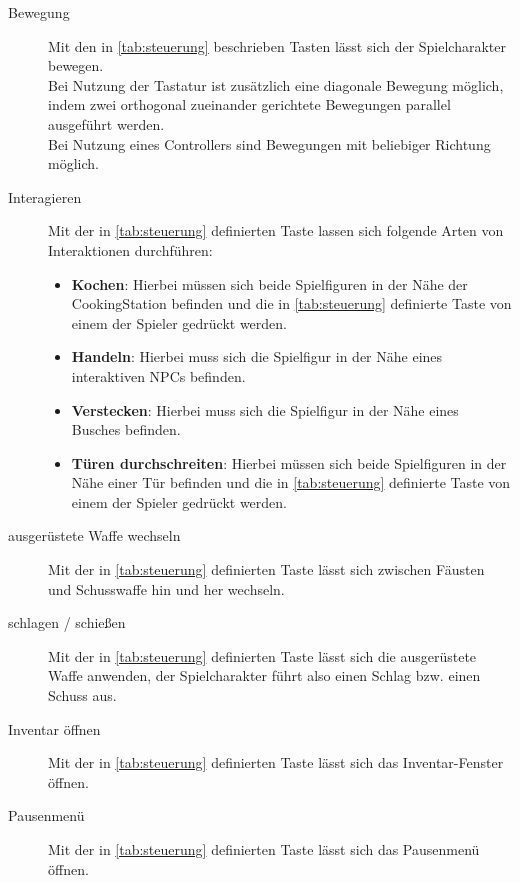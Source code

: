 \begin{description}
    \item[Bewegung]
    Mit den in \ref{tab:steuerung} beschrieben Tasten lässt sich der Spielcharakter bewegen. \\
    Bei Nutzung der Tastatur ist zusätzlich eine diagonale Bewegung möglich, indem zwei orthogonal
    zueinander gerichtete Bewegungen parallel ausgeführt werden. \\
    Bei Nutzung eines Controllers sind Bewegungen mit beliebiger Richtung möglich.
    \item[Interagieren]
    Mit der in \ref{tab:steuerung} definierten Taste lassen sich folgende Arten von
    Interaktionen durchführen:
    \begin{itemize}
        \item \textbf{Kochen}:
        Hierbei müssen sich beide Spielfiguren in der Nähe der CookingStation befinden
        und die in \ref{tab:steuerung} definierte Taste von einem der Spieler
        gedrückt werden.
        \item \textbf{Handeln}:
        Hierbei muss sich die Spielfigur in der Nähe eines interaktiven NPCs befinden.
        \item \textbf{Verstecken}:
        Hierbei muss sich die Spielfigur in der Nähe eines Busches befinden.
        \item \textbf{Türen durchschreiten}:
        Hierbei müssen sich beide Spielfiguren in der Nähe einer Tür befinden
        und die in \ref{tab:steuerung} definierte Taste von einem der Spieler
        gedrückt werden.
    \end{itemize}
    \item[ausgerüstete Waffe wechseln]
    Mit der in \ref{tab:steuerung} definierten Taste lässt sich zwischen Fäusten
    und Schusswaffe hin und her wechseln.
    \item[schlagen / schießen]
    Mit der in \ref{tab:steuerung} definierten Taste lässt sich die ausgerüstete Waffe
    anwenden, der Spielcharakter führt also einen Schlag bzw. einen Schuss aus.
    \item[Inventar öffnen]
    Mit der in \ref{tab:steuerung} definierten Taste lässt sich das Inventar-Fenster
    öffnen.
    \item[Pausenmenü]
    Mit der in \ref{tab:steuerung} definierten Taste lässt sich das Pausenmenü
    öffnen.
\end{description}
